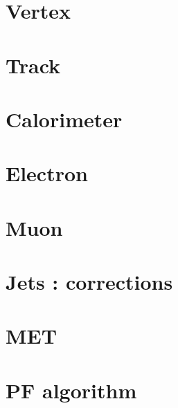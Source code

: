 \section{ Vertex }
\section{ Track }
\section{ Calorimeter }
\section{ Electron }
\section{ Muon }
\section{ Jets : corrections }
\section{ MET }
\section{ PF algorithm }
